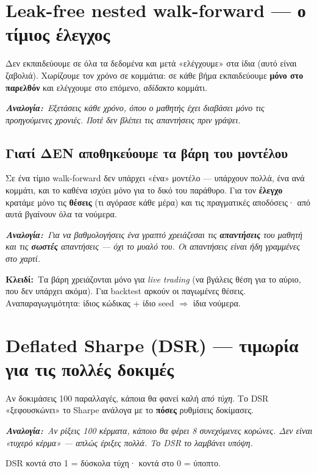 \documentclass[11pt]{article}
\newcommand{\key}[1]{\par\medskip\noindent\colorbox{soft}{\parbox{\dimexpr\linewidth-2\fboxsep}{\textcolor{accent}{\textbf{Κλειδί:}}\ #1}}\par\medskip}
\newcommand{\analogy}[1]{\par\smallskip\noindent\textit{\textbf{Αναλογία:}\ #1}\par\smallskip}
\begin{document}
\section{Leak-free nested walk-forward --- ο τίμιος έλεγχος}
Δεν εκπαιδεύουμε σε όλα τα δεδομένα και μετά «ελέγχουμε» στα ίδια (αυτό είναι ζαβολιά). Χωρίζουμε τον
χρόνο σε κομμάτια: σε κάθε βήμα εκπαιδεύουμε \textbf{μόνο στο παρελθόν} και ελέγχουμε στο επόμενο,
\emph{αδίδακτο} κομμάτι.
\analogy{Εξετάσεις κάθε χρόνο, όπου ο μαθητής έχει διαβάσει μόνο τις προηγούμενες χρονιές. Ποτέ δεν
βλέπει τις απαντήσεις πριν γράψει.}

\subsection{Γιατί ΔΕΝ αποθηκεύουμε τα βάρη του μοντέλου}
Σε ένα τίμιο walk-forward δεν υπάρχει «ένα» μοντέλο --- υπάρχουν πολλά, ένα ανά κομμάτι, και το καθένα
ισχύει μόνο για το δικό του παράθυρο. Για τον \textbf{έλεγχο} κρατάμε μόνο τις \textbf{θέσεις} (τι αγόρασε
κάθε μέρα) και τις πραγματικές αποδόσεις· από αυτά βγαίνουν όλα τα νούμερα.
\analogy{Για να βαθμολογήσεις ένα γραπτό χρειάζεσαι τις \textbf{απαντήσεις} του μαθητή και τις
\textbf{σωστές} απαντήσεις --- όχι το μυαλό του. Οι απαντήσεις είναι ήδη γραμμένες στο χαρτί.}
\key{Τα βάρη χρειάζονται μόνο για \emph{live trading} (να βγάλεις θέση για το αύριο, που δεν υπάρχει
ακόμα). Για backtest αρκούν οι παγωμένες θέσεις. Αναπαραγωγιμότητα: ίδιος κώδικας + ίδιο seed
$\Rightarrow$ ίδια νούμερα.}

\section{Deflated Sharpe (DSR) --- τιμωρία για τις πολλές δοκιμές}
Αν δοκιμάσεις 100 παραλλαγές, κάποια θα φανεί καλή \emph{από τύχη}. Το DSR «ξεφουσκώνει» το Sharpe
ανάλογα με το \textbf{πόσες} ρυθμίσεις δοκίμασες.
\analogy{Αν ρίξεις 100 κέρματα, κάποιο θα φέρει 8 συνεχόμενες κορώνες. Δεν είναι «τυχερό κέρμα» ---
απλώς έριξες πολλά. Το DSR το λαμβάνει υπόψη.} DSR κοντά στο 1 = δύσκολα τύχη· κοντά στο 0 = ύποπτο.
\end{document}
